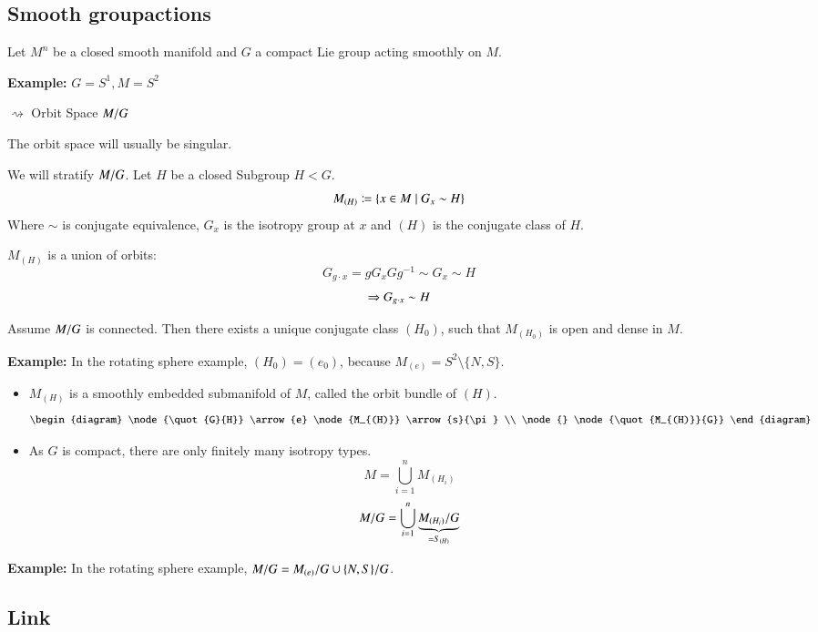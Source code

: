 \subsection*{Smooth groupactions}

Let $M^n$ be a closed smooth manifold and $G$ a compact Lie group acting smoothly on $M$.

\textbf{Example:} $G = S^1, M = S^2$ %

$\rightsquigarrow$ Orbit Space $M / G$

The orbit space will usually be singular.

We will stratify $M / G$. Let $H$ be a closed Subgroup $H < G$.
\[ M_{(H)} \coloneqq \{ x \in M \mid G_x \sim H \} \]
Where $\sim$ is conjugate equivalence, $G_x$ is the isotropy group at $x$ and $(H)$ is the conjugate class of $H$.

$M_{(H)}$ is a union of orbits:
\[ G_{g\cdot x} = gG_xGg^{-1} \sim G_x \sim H \]
\[ \Rightarrow G_{g\cdot x} \sim H \]
\begin{proposition}
    Assume $M / G$ is connected. Then there exists a unique conjugate class $(H_0)$, such that $M_{(H_0)}$ is open and dense in $M$.
\end{proposition}

\textbf{Example:} In the rotating sphere example, $(H_0) = (e_0)$, because $M_{(e)} = S^2 \setminus \{N,S\}$.

\begin{itemize}
    \item $M_{(H)}$ is a smoothly embedded submanifold of $M$, called the orbit bundle of $(H)$.
    \[\begin{diagram}
        \node{\quot{G}{H}}
            \arrow{e}
        \node{M_{(H)}}
            \arrow{s}{\pi} \\
        \node{}
        \node{\quot{M_{(H)}}{G}}
    \end{diagram}\]
    \item As $G$ is compact, there are only finitely many isotropy types.
    \[ M = \bigcup_{i=1}^n M_{(H_i)} \]
    \[ M / G = \bigcup_{i=1}^n \underbrace{M_{(H_i)} / G}_{=S_{(H)}} \]
\end{itemize}

\textbf{Example:} In the rotating sphere example, $M / G = M_{(e)} / G \cup \{ N, S\} / G$.

\subsection*{Link}

